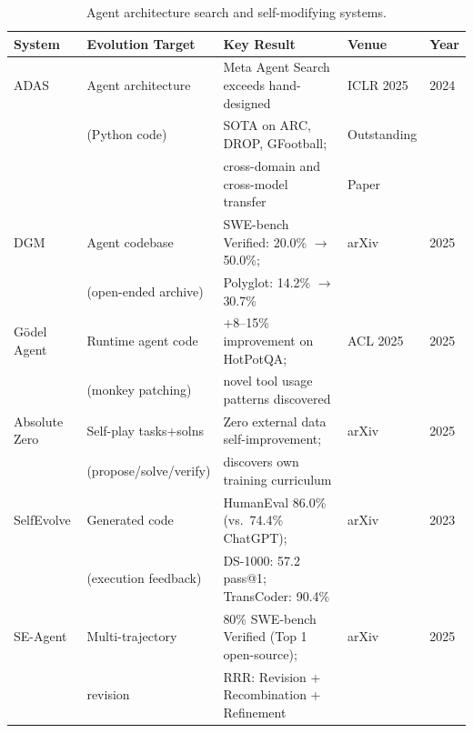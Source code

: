 \begin{table}[t]
\centering
\caption{Agent architecture search and self-modifying systems.}
\label{tab:bench-archsearch}
\begin{tabular}{@{}llp{55mm}ll@{}}
\toprule
\textbf{System} & \textbf{Evolution Target} & \textbf{Key Result} & \textbf{Venue} & \textbf{Year} \\
\midrule
ADAS & Agent architecture & Meta Agent Search exceeds hand-designed & ICLR 2025 & 2024 \\
 & (Python code) & SOTA on ARC, DROP, GFootball; & Outstanding & \\
 & & cross-domain and cross-model transfer & Paper & \\
DGM & Agent codebase & SWE-bench Verified: 20.0\% $\to$ 50.0\%; & arXiv & 2025 \\
 & (open-ended archive) & Polyglot: 14.2\% $\to$ 30.7\% & & \\
G\"odel Agent & Runtime agent code & +8--15\% improvement on HotPotQA; & ACL 2025 & 2025 \\
 & (monkey patching) & novel tool usage patterns discovered & & \\
Absolute Zero & Self-play tasks+solns & Zero external data self-improvement; & arXiv & 2025 \\
 & (propose/solve/verify) & discovers own training curriculum & & \\
SelfEvolve & Generated code & HumanEval 86.0\% (vs.\ 74.4\% ChatGPT); & arXiv & 2023 \\
 & (execution feedback) & DS-1000: 57.2 pass@1; TransCoder: 90.4\% & & \\
SE-Agent & Multi-trajectory & 80\% SWE-bench Verified (Top 1 open-source); & arXiv & 2025 \\
 & revision & RRR: Revision + Recombination + Refinement & & \\
\bottomrule
\end{tabular}
\end{table}

